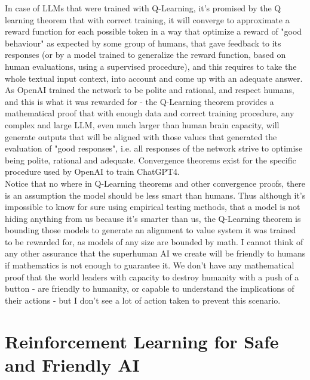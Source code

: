 \documentclass{article}
\begin{document}
 In case of LLMs that were trained with Q-Learning, it's promised by the Q learning theorem that with correct training, it will converge to approximate a reward function for each possible token in a way that optimize a reward of "good behaviour" as expected by some group of humans, that gave feedback to its responses (or by a model trained to generalize the reward function, based on human evaluations, using a supervised procedure\cite{lin2020review}), and this requires to take the whole textual input context, into account and come up with an adequate answer. As OpenAI trained the network to be polite and rational, and respect humans, and this is what it was rewarded for - the Q-Learning theorem provides a mathematical proof that with enough data and correct training procedure, any complex and large LLM, even much larger than human brain capacity, will generate outputs that will be aligned with those values that generated the evaluation of "good responses", i.e. all responses of the network strive to optimise being polite, rational and adequate. Convergence theorems exist for the specific procedure used by OpenAI to train ChatGPT4\cite{zhu2023principled}.\\

Notice that no where in Q-Learning theorems and other convergence proofs, there is an assumption the model should be less smart than humans. Thus although it's impossible to know for sure using empirical testing methods, that a model is not hiding anything from us because it's smarter than us, the Q-Learning theorem is bounding those models to generate an alignment to value system it was trained to be rewarded for, as models of any size are bounded by math. I cannot think of any other assurance that the superhuman AI we create will be friendly to humans if mathematics is not enough to guarantee it. We don't have any mathematical proof that the world leaders with capacity to destroy humanity with a push of a button - are friendly to humanity, or capable to understand the implications of their actions - but I don't see a lot of action taken to prevent this scenario. \\

\section{Reinforcement Learning for Safe and Friendly AI}
\end{document}
